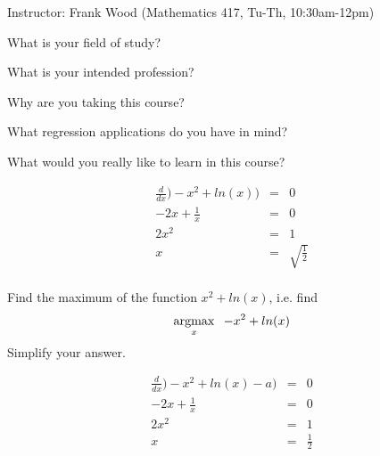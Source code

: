 \documentclass[12pt]{article}
\newcommand{\argmax}{\operatornamewithlimits{argmax}}
\begin{document}
 \begin{center}
  Instructor: Frank Wood (Mathematics 417, Tu-Th, 10:30am-12pm) 
 \end{center}
{}
\finishfirstpage



{
\abcs
\item
What is your field of study?  
\item 
What is your intended profession?  
\item
Why are you taking this course?
\item
What regression applications do you have in mind?
\item
What would you really like to learn in this course?
\endabcs
}
{
\vfill
\vspace{3cm}
}
{
\begin{eqnarray}
 \frac{d}{dx})-x^2 + ln(x) ) &=& 0 \\
 -2x+\frac{1}{x} &=& 0 \\
  2x^2 &=& 1 \\
  x &=& \sqrt{\frac{1}{2}} \\
\end{eqnarray}
}

{
Find the maximum of the function $x^2+ln(x)$, i.e. find  \[\argmax_{x}  \;\;-x^2+ln(x)\]  Simplify your answer.
}
{
\vspace{3cm}

\vfill
  \answer
}
{
\begin{eqnarray}
 \frac{d}{dx})-x^2 + ln(x) -a) &=& 0 \\
 -2x+\frac{1}{x} &=& 0 \\
  2x^2 &=& 1 \\
  x &=& \frac{1}{2} \\
\end{eqnarray}
}
\end{document}
